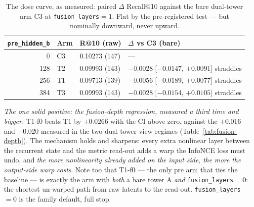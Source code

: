 \documentclass[11pt]{article}
\begin{document}
\begin{table}[ht]
  \centering
  \caption{The dose curve, as measured: paired $\Delta$ Recall@10 against the
  bare dual-tower arm C3 at \texttt{fusion\_layers}${}=1$. Flat by the
  pre-registered test --- but nominally downward, never upward.}
  \label{tab:preencoder-dose}
  {\footnotesize\setlength{\tabcolsep}{6pt}\begin{tabular}{rlll}
    \toprule
    \texttt{pre\_hidden\_b} & Arm & R@10 (raw) & $\Delta$ vs C3 (bare) \\
    \midrule
    0 & C3 & 0.10273 (147) & --- \\
    128 & T2 & 0.09993 (143) & $-0.0028$ [$-0.0147$, $+0.0091$] straddles \\
    256 & T1 & 0.09713 (139) & $-0.0056$ [$-0.0189$, $+0.0077$] straddles \\
    384 & T3 & 0.09993 (143) & $-0.0028$ [$-0.0154$, $+0.0105$] straddles \\
    \bottomrule
  \end{tabular}}
\end{table}

\emph{The one solid positive: the fusion-depth regression, measured a third
time and bigger.} T1-f0 beats T1 by $+\num{0.0266}$ with the CI above zero,
against the $+\num{0.016}$ and $+\num{0.020}$ measured in the two dual-tower view
regimes (Table~\ref{tab:fusion-depth}). The mechanism holds and sharpens: every
extra nonlinear layer between the recurrent state and the metric read-out adds a
warp the InfoNCE loss must undo, and \emph{the more nonlinearity already added on
the input side, the more the output-side warp costs}. Note too that T1-f0 --- the
only pre arm that ties the baseline --- is exactly the arm with \emph{both} a bare
tower A \emph{and} \texttt{fusion\_layers}${}=0$: the shortest un-warped path from
raw latents to the read-out. \texttt{fusion\_layers}${}=0$ is the family default,
full stop.
\end{document}
